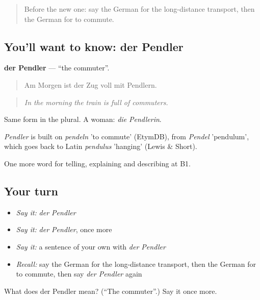 \label{lesson:GE-C414-pendler}



\begin{quote}
Before the new one: say the German for the long-distance transport, then the German for to commute.
\end{quote}

\subsection*{You'll want to know: der Pendler}
\textbf{der Pendler} — \textquotedblleft{}the commuter\textquotedblright{}.

\begin{quote}
Am Morgen ist der Zug voll mit Pendlern.
\end{quote}

\begin{quote}
\emph{In the morning the train is full of commuters.}
\end{quote}

Same form in the plural. A woman: \emph{die Pendlerin}.

\begin{cousinweb}
\emph{Pendler} is built on \emph{pendeln} 'to commute' (EtymDB), from \emph{Pendel} 'pendulum', which goes back to Latin \emph{pendulus} 'hanging' (Lewis \& Short).
\end{cousinweb}

\begin{grammarlens}[title={What you've built}]
One more word for telling, explaining and describing at B1.
\end{grammarlens}

\subsection*{Your turn}
\begin{itemize}
\raggedright
  \item \emph{Say it:} \emph{der Pendler}
  \item \emph{Say it:} \emph{der Pendler}, once more
  \item \emph{Say it:} a sentence of your own with \emph{der Pendler}
  \item \emph{Recall:} say the German for the long-distance transport, then the German for to commute, then say \emph{der Pendler} again
\end{itemize}

\begin{tcolorbox}[breakable,colback=teal!4,colframe=teal!35!black,title={Before you move on}]
What does der Pendler mean? (\textquotedblleft{}The commuter\textquotedblright{}.) Say it once more.
\end{tcolorbox}
